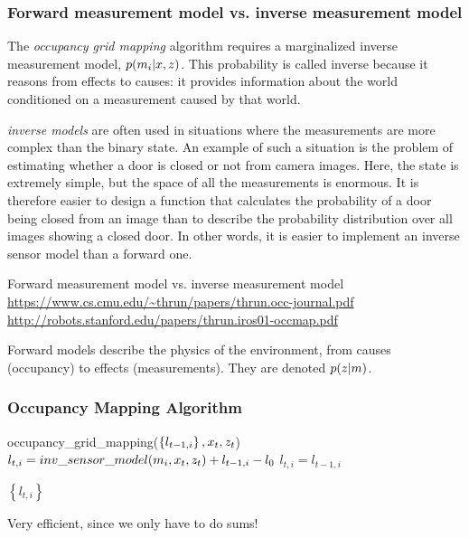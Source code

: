 \begin{frame}
    \frametitle{Forward measurement model vs. inverse measurement model}
    
    
    The \emph{occupancy grid mapping} algorithm requires a marginalized inverse measurement model, $p(m_{i}|x, z )$. This probability is called inverse because it reasons from effects to causes: it provides information about the world conditioned on a measurement caused by that world.
    
    \emph{inverse models} are often used in situations where the measurements are more complex than the binary state. An example of such a situation is the problem of estimating whether a door is closed or not from camera images. Here, the state is extremely simple, but the space of all the measurements is enormous. It is therefore easier to design a function that calculates the probability of a door being closed from an image than to describe the probability distribution over all images showing a closed door. In other words, it is easier to implement an inverse sensor model than a forward one.
    
    Forward measurement model vs. inverse measurement model
    \url{https://www.cs.cmu.edu/~thrun/papers/thrun.occ-journal.pdf}
    \url{http://robots.stanford.edu/papers/thrun.iros01-occmap.pdf}
    
    Forward models describe the physics of the environment, from causes (occupancy) to effects (measurements). They are denoted $p(z | m)$.
    
    \end{frame}
    
    \begin{frame}
    \frametitle{Occupancy Mapping Algorithm}
    
    \begin{algorithmic}[1]
    \State occupancy\_grid\_mapping($\left\lbrace l_{t-1,i} \right\rbrace, x_{t}, z_{t}$)
    \State $l_{t,i} = inv\_sensor\_model(m_{i}, x_{t}, z_{t}) + l_{t-1,i} - l_{0}$
    \Else
    \State $l_{t,i} = l_{t-1,i}$
    \EndIf
    \EndFor
    
    \State \Return $\left\lbrace l_{t,i} \right\rbrace$
    \end{algorithmic}
    Very efficient, since we only have to do sums!
    
    \end{frame}
    

